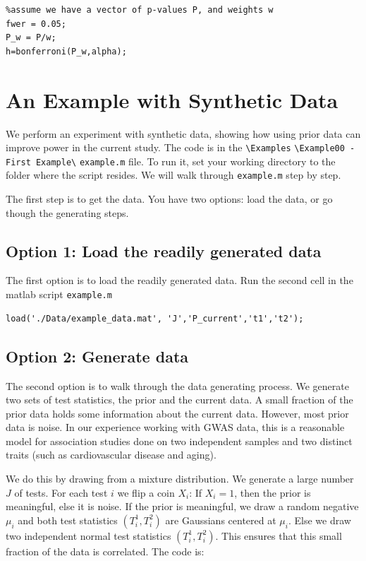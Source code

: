 \documentclass[english,11pt]{article} %
\begin{document}
\begin{verbatim}
%assume we have a vector of p-values P, and weights w
fwer = 0.05;
P_w = P/w;
h=bonferroni(P_w,alpha);
\end{verbatim}


\section{An Example with Synthetic Data}
\label{example}

We perform an experiment with synthetic data, showing how using prior data can improve power in the current study. The code is in the \verb+\Examples+ \verb+\Example00 - First Example\+ \verb+example.m+ file. To run it, set your working directory to the folder where the script resides. We will walk through  \verb+example.m+ step by step.

The first step is to get the data. You have two options: load the data, or go though the generating steps.

\subsection{Option 1: Load the readily generated data}

The first option is to load the readily generated data. Run the second cell in the matlab script \verb+example.m+

\begin{verbatim}
load('./Data/example_data.mat', 'J','P_current','t1','t2');
\end{verbatim}


\subsection{Option 2: Generate data}

The second option is to walk through the data generating process. We generate two sets of test statistics, the prior and the current data. A small fraction of the prior data holds some information about the current data. However, most prior data is noise. In our experience working with GWAS data, this is a reasonable model for association studies done on two independent samples and two distinct traits (such as cardiovascular disease and aging).

We do this by drawing from a mixture distribution. We generate a large number $J$ of tests. For each test $i$ we flip a coin $X_i$: If $X_i=1$, then the prior is meaningful, else it is noise. If the prior is meaningful, we draw a random negative $\mu_i$ and both test statistics $(T^{1}_i,T^{2}_i)$ are Gaussians centered at $\mu_i$. Else we draw two independent normal test statistics $(T^{1}_i,T^{2}_i)$. This ensures that this small fraction of the data is correlated. The code is:
\end{document}
